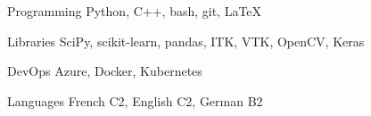 

\begin{cvskills}

  \cvskill
    {Programming} %
    {Python, C++, bash, git, \LaTeX} %

  \cvskill
    {Libraries} %
    {SciPy, scikit-learn, pandas, ITK, VTK, OpenCV, Keras} %

  \cvskill
    {DevOps} %
    {Azure, Docker, Kubernetes} %

  \cvskill
    {Languages} %
    {French {\color{awesome}C2}, English {\color{awesome}C2}, German {\color{awesome}B2}} %

\end{cvskills}
